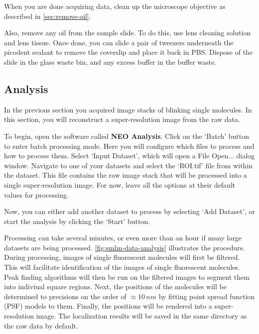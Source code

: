 \documentclass[10pt,a4paper,oneside]{book}
\begin{document}
\newline

When you are done acquiring data, clean up the microscope objective as described in \autoref{sec:remove-oil}.

Also, remove any oil from the sample slide. To do this, use lens cleaning solution and lens tissue. Once done, you can slide a pair of tweezers underneath the picodent sealant to remove the coverslip and place it back in PBS. Dispose of the slide in the glass waste bin, and any excess buffer in the buffer waste.

\subsection{Analysis}

In the previous section you acquired image stacks of blinking single molecules. In this section, you will reconstruct a super-resolution image from the raw data.

To begin, open the software called \textbf{NEO Analysis}. Click on the `Batch' button to enter batch processing mode. Here you will configure which files to process and how to process them. Select `Input Dataset', which will open a File Open... dialog window. Navigate to one of your datasets and select the `ROI.tif' file from within the dataset. This file contains the raw image stack that will be processed into a single super-resolution image. For now, leave all the options at their default values for processing.

Now, you can either add another dataset to process by selecting `Add Dataset', or start the analysis by clicking the `Start' button.

Processing can take several minutes, or even more than an hour if many large datasets are being processed. \autoref{fig:smlm-data-analysis} illustrates the procedure. During processing, images of single fluorescent molecules will first be filtered. This will facilitate identification of the images of single fluorescent molecules. Peak finding algorithms will then be run on the filtered images to segment them into indiviual square regions. Next, the positions of the molecules will be determined to precisions on the order of $\approx 10 \, nm$ by fitting point spread function (PSF) models to them. Finally, the positions will be rendered into a super-resolution image. The localization results will be saved in the same directory as the raw data by default.
\end{document}
